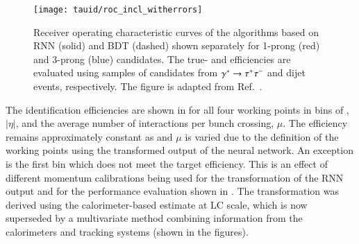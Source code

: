 \begin{figure}[htbp]
  \centering

  \texttt{[image: tauid/roc\_incl\_witherrors]}

  \caption[Receiver operating characteristic curves of the \tauid algorithms
  based on RNN and BDT.]{Receiver operating characteristic curves of the \tauid
    algorithms based on RNN (solid) and BDT (dashed) shown separately for
    1-prong (red) and 3-prong (blue) \tauhadvis candidates. The true- and
    \faketauhadvisC efficiencies are evaluated using samples of \tauhadvis
    candidates from $\gamma^{*} \to \tau^{+} \tau^{-}$ and dijet events, respectively. The
    figure is adapted from Ref.~\cite{ATL-PHYS-PUB-2019-033}.} %
  \label{fig:tauid_rnn_bdt_roc_comparison}
\end{figure}

The \tauhadvis identification efficiencies
are shown in  for all four working points in bins of
\tauhadvis \pT, \tauhadvis $|\eta|$, and the average number of interactions per
bunch crossing, $\mu$. The efficiency remains approximately constant as
\tauhadvis \pT and $\mu$ is varied due to the definition of the working points
using the transformed output of the neural network. An exception is the first
\tauhadvis \pT bin which does not meet the target efficiency. This is an effect
of different \tauhadvis momentum calibrations being used for the transformation
of the RNN output and for the performance evaluation shown in
. The transformation was
derived using the calorimeter-based \tauhadvis \pT estimate at LC scale, which
is now superseded by a multivariate method combining information from the
calorimeters and tracking systems (shown in the figures).

